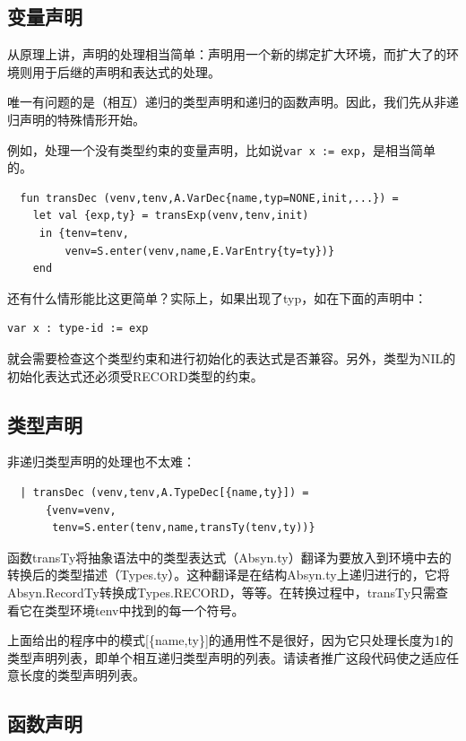 \documentclass[cn,11pt,chinese]{elegantbook}
\begin{document}
\subsection{变量声明}

从原理上讲，声明的处理相当简单：声明用一个新的绑定扩大环境，而扩大了的环境则用于后继的声明和表达式的处理。

唯一有问题的是（相互）递归的类型声明和递归的函数声明。因此，我们先从非递归声明的特殊情形开始。

例如，处理一个没有类型约束的变量声明，比如说\lstinline{var x := exp}，是相当简单的。

\begin{lstlisting}
  fun transDec (venv,tenv,A.VarDec{name,typ=NONE,init,...}) =
    let val {exp,ty} = transExp(venv,tenv,init)
     in {tenv=tenv,
         venv=S.enter(venv,name,E.VarEntry{ty=ty})}
    end
\end{lstlisting}

还有什么情形能比这更简单？实际上，如果出现了typ，如在下面的声明中：

\begin{lstlisting}
var x : type-id := exp
\end{lstlisting}

就会需要检查这个类型约束和进行初始化的表达式是否兼容。另外，类型为NIL的初始化表达式还必须受RECORD类型的约束。

\subsection{类型声明}

非递归类型声明的处理也不太难：

\begin{lstlisting}
  | transDec (venv,tenv,A.TypeDec[{name,ty}]) =
      {venv=venv,
       tenv=S.enter(tenv,name,transTy(tenv,ty))}
\end{lstlisting}

函数transTy将抽象语法中的类型表达式（Absyn.ty）翻译为要放入到环境中去的转换后的类型描述（Types.ty）。这种翻译是在结构Absyn.ty上递归进行的，它将Absyn.RecordTy转换成Types.RECORD，等等。在转换过程中，transTy只需查看它在类型环境tenv中找到的每一个符号。

上面给出的程序中的模式[\{name,ty\}]的通用性不是很好，因为它只处理长度为1的类型声明列表，即单个相互递归类型声明的列表。请读者推广这段代码使之适应任意长度的类型声明列表。

\subsection{函数声明}
\end{document}
